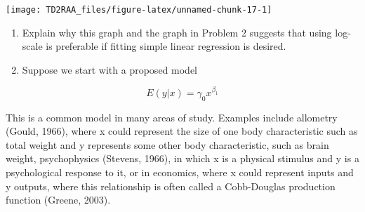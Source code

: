 \documentclass[
]{article}
\newenvironment{Shaded}{\begin{snugshade}}{\end{snugshade}}
\newcommand{\AttributeTok}[1]{\textcolor[rgb]{0.77,0.63,0.00}{#1}}
\newcommand{\DecValTok}[1]{\textcolor[rgb]{0.00,0.00,0.81}{#1}}
\newcommand{\FloatTok}[1]{\textcolor[rgb]{0.00,0.00,0.81}{#1}}
\newcommand{\FunctionTok}[1]{\textcolor[rgb]{0.00,0.00,0.00}{#1}}
\newcommand{\NormalTok}[1]{#1}
\newcommand{\SpecialCharTok}[1]{\textcolor[rgb]{0.00,0.00,0.00}{#1}}
\newcommand{\StringTok}[1]{\textcolor[rgb]{0.31,0.60,0.02}{#1}}
\begin{document}
\begin{Shaded}
\end{Shaded}

\begin{center}\texttt{[image: TD2RAA\_files/figure-latex/unnamed-chunk-17-1]} \end{center}

\begin{enumerate}
\def\labelenumi{\alph{enumi}.}
\item
  Explain why this graph and the graph in Problem 2 suggests that using
  log-scale is preferable if fitting simple linear regression is
  desired.
\item
  Suppose we start with a proposed model
\end{enumerate}

\[
E(y|x) = \gamma_0 x^{\beta_1}
\]

This is a common model in many areas of study. Examples include
allometry (Gould, 1966), where x could represent the size of one body
characteristic such as total weight and y represents some other body
characteristic, such as brain weight, psychophysics (Stevens, 1966), in
which x is a physical stimulus and y is a psychological response to it,
or in economics, where x could represent inputs and y outputs, where
this relationship is often called a Cobb-Douglas production function
(Greene, 2003).
\end{document}
